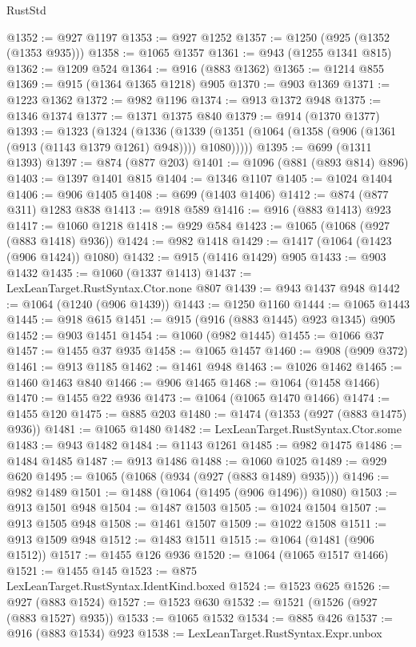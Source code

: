 \begin{lexlean}{RustStd}
\begin{coremodule}
@1352 := @927 @1197
@1353 := @927 @1252
@1357 := @1250 (@925 (@1352 (@1353 @935)))
@1358 := @1065 @1357
@1361 := @943 (@1255 @1341 @815)
@1362 := @1209 @524
@1364 := @916 (@883 @1362)
@1365 := @1214 @855
@1369 := @915 (@1364 @1365 @1218) @905
@1370 := @903 @1369
@1371 := @1223 @1362
@1372 := @982 @1196
@1374 := @913 @1372 @948
@1375 := @1346 @1374
@1377 := @1371 @1375 @840
@1379 := @914 (@1370 @1377)
@1393 := @1323
    (@1324
      (@1336 (@1339 (@1351 (@1064 (@1358 (@906 (@1361 (@913 (@1143 @1379 @1261) @948)))) @1080)))))
@1395 := @699 (@1311 @1393)
@1397 := @874 (@877 @203)
@1401 := @1096 (@881 (@893 @814) @896)
@1403 := @1397 @1401 @815
@1404 := @1346 @1107
@1405 := @1024 @1404
@1406 := @906 @1405
@1408 := @699 (@1403 @1406)
@1412 := @874 (@877 @311) @1283 @838
@1413 := @918 @589
@1416 := @916 (@883 @1413) @923
@1417 := @1060 @1218
@1418 := @929 @584
@1423 := @1065 (@1068 (@927 (@883 @1418) @936))
@1424 := @982 @1418
@1429 := @1417 (@1064 (@1423 (@906 @1424)) @1080)
@1432 := @915 (@1416 @1429) @905
@1433 := @903 @1432
@1435 := @1060 (@1337 @1413)
@1437 := LexLeanTarget.RustSyntax.Ctor.none @807
@1439 := @943 @1437 @948
@1442 := @1064 (@1240 (@906 @1439))
@1443 := @1250 @1160
@1444 := @1065 @1443
@1445 := @918 @615
@1451 := @915 (@916 (@883 @1445) @923 @1345) @905
@1452 := @903 @1451
@1454 := @1060 (@982 @1445)
@1455 := @1066 @37
@1457 := @1455 @37 @935
@1458 := @1065 @1457
@1460 := @908 (@909 @372)
@1461 := @913 @1185
@1462 := @1461 @948
@1463 := @1026 @1462
@1465 := @1460 @1463 @840
@1466 := @906 @1465
@1468 := @1064 (@1458 @1466)
@1470 := @1455 @22 @936
@1473 := @1064 (@1065 @1470 @1466)
@1474 := @1455 @120
@1475 := @885 @203
@1480 := @1474 (@1353 (@927 (@883 @1475) @936))
@1481 := @1065 @1480
@1482 := LexLeanTarget.RustSyntax.Ctor.some
@1483 := @943 @1482
@1484 := @1143 @1261
@1485 := @982 @1475
@1486 := @1484 @1485
@1487 := @913 @1486
@1488 := @1060 @1025
@1489 := @929 @620
@1495 := @1065 (@1068 (@934 (@927 (@883 @1489) @935)))
@1496 := @982 @1489
@1501 := @1488 (@1064 (@1495 (@906 @1496)) @1080)
@1503 := @913 @1501 @948
@1504 := @1487 @1503
@1505 := @1024 @1504
@1507 := @913 @1505 @948
@1508 := @1461 @1507
@1509 := @1022 @1508
@1511 := @913 @1509 @948
@1512 := @1483 @1511
@1515 := @1064 (@1481 (@906 @1512))
@1517 := @1455 @126 @936
@1520 := @1064 (@1065 @1517 @1466)
@1521 := @1455 @145
@1523 := @875 LexLeanTarget.RustSyntax.IdentKind.boxed
@1524 := @1523 @625
@1526 := @927 (@883 @1524)
@1527 := @1523 @630
@1532 := @1521 (@1526 (@927 (@883 @1527) @935))
@1533 := @1065 @1532
@1534 := @885 @426
@1537 := @916 (@883 @1534) @923
@1538 := LexLeanTarget.RustSyntax.Expr.unbox

\end{coremodule}
\end{lexlean}
